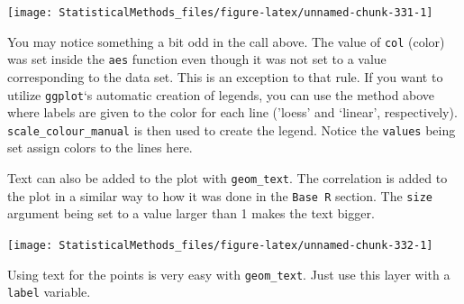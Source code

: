 \documentclass[
]{book}
\newenvironment{Shaded}{\begin{snugshade}}{\end{snugshade}}
\newcommand{\DataTypeTok}[1]{\textcolor[rgb]{0.13,0.29,0.53}{#1}}
\newcommand{\DecValTok}[1]{\textcolor[rgb]{0.00,0.00,0.81}{#1}}
\newcommand{\KeywordTok}[1]{\textcolor[rgb]{0.13,0.29,0.53}{\textbf{#1}}}
\newcommand{\NormalTok}[1]{#1}
\newcommand{\OperatorTok}[1]{\textcolor[rgb]{0.81,0.36,0.00}{\textbf{#1}}}
\newcommand{\StringTok}[1]{\textcolor[rgb]{0.31,0.60,0.02}{#1}}
\theoremstyle{definition}
\theoremstyle{definition}
\theoremstyle{definition}
\theoremstyle{remark}
\begin{document}
\begin{center}\texttt{[image: StatisticalMethods\_files/figure-latex/unnamed-chunk-331-1]} \end{center}

You may notice something a bit odd in the call above. The value of \texttt{col} (color) was set inside the \texttt{aes} function even though it was not set to a value corresponding to the data set. This is an exception to that rule. If you want to utilize \texttt{ggplot}`s automatic creation of legends, you can use the method above where labels are given to the color for each line ('loess' and `linear', respectively). \texttt{scale\_colour\_manual} is then used to create the legend. Notice the \texttt{values} being set assign colors to the lines here.

Text can also be added to the plot with \texttt{geom\_text}. The correlation is added to the plot in a similar way to how it was done in the \texttt{Base\ R} section. The \texttt{size} argument being set to a value larger than 1 makes the text bigger.

\begin{Shaded}
\end{Shaded}

\begin{center}\texttt{[image: StatisticalMethods\_files/figure-latex/unnamed-chunk-332-1]} \end{center}

Using text for the points is very easy with \texttt{geom\_text}. Just use this layer with a \texttt{label} variable.
\end{document}
